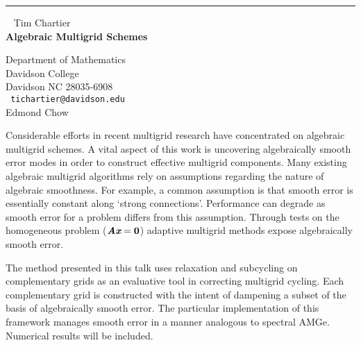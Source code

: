 \documentclass{report}
\def\mathbi#1{\textbf{\em #1}}
\begin{document}
\begin{center}

\rule{6in}{1pt} \
{\large
Tim Chartier
\\ {\bf
Algebraic Multigrid Schemes
}}

Department of Mathematics
\\
Davidson College
\\
Davidson NC 28035-6908
\\ {\tt
tichartier@davidson.edu
}
\\
Edmond Chow
\end{center}

Considerable efforts in recent multigrid research have concentrated on
algebraic multigrid schemes. A vital aspect of this work is uncovering
algebraically smooth error modes in order to construct effective
multigrid components. Many existing algebraic multigrid algorithms rely
on assumptions regarding the nature of algebraic smoothness. For
example, a common assumption is that smooth error is essentially
constant along `strong connections'. Performance can degrade as smooth
error for a problem differs from this assumption. Through tests on the
homogeneous problem
($\mathbi{Ax} = \mathbf{0}$)
adaptive multigrid methods expose
algebraically smooth error.

The method presented in this talk uses relaxation and subcycling on
complementary grids as an evaluative tool in correcting multigrid
cycling. Each complementary grid is constructed with the intent of
dampening a subset of the basis of algebraically smooth error. The
particular implementation of this framework manages smooth error in a
manner analogous to spectral AMGe. Numerical results will be included.
\end{document}

